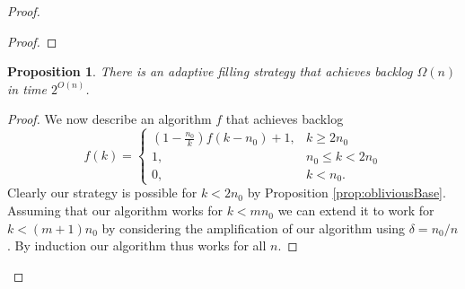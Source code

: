 \documentclass[twocolumn]{article}[10pt]
\newtheorem{proposition}{Proposition}
\begin{document}
\begin{proof}
\begin{proof}
  \end{proof}

  \begin{proposition}
    There is an adaptive filling strategy that achieves backlog $\Omega(n)$ in
    time $2^{O(n)}$.
  \end{proposition}
  \begin{proof}
    We now describe an algorithm $f$ that achieves backlog 
    $$f(k) = \begin{cases}
      \left(1-\frac{n_0}{k}\right)f(k-n_0) + 1, &k \ge 2n_0\\
      1,  &n_0\le k < 2n_0 \\
      0, &k< n_0.
    \end{cases}$$
    Clearly our strategy is possible for $k<2n_0$ by Proposition \ref{prop:obliviousBase}.
    Assuming that our algorithm works for $k<mn_0$ we can extend it to work for
    $k<(m+1)n_0$ by considering the amplification of our algorithm using $\delta = n_0/n$.
    By induction our algorithm thus works for all $n$.


\end{proof}
\end{proof}
\end{document}
